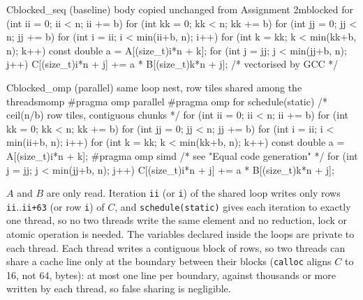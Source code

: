\documentclass[11pt,a4paper]{article}
\newcommand{\concept}[1]{\par\addvspace{8pt}\Needspace{5\baselineskip}%
  \noindent{\color{accent}\bfseries\boldmath #1}\par\nopagebreak\vspace{2pt}}
\begin{document}
\par\addvspace{4pt}
\label{lst:kernels}
\nopagebreak\vspace{2pt}
\begin{codebox}{C}{blocked\_seq (baseline) \textperiodcentered{} body copied unchanged from Assignment 2}{mblocked}
for (int ii = 0; ii < n; ii += b)
  for (int kk = 0; kk < n; kk += b)
    for (int jj = 0; jj < n; jj += b)
      for (int i = ii; i < min(ii+b, n); i++)
        for (int k = kk; k < min(kk+b, n); k++) {
          const double a = A[(size_t)i*n + k];
          for (int j = jj; j < min(jj+b, n); j++)
            C[(size_t)i*n + j] += a * B[(size_t)k*n + j];   /* vectorised by GCC */
        }
\end{codebox}
\vspace{3pt}
\begin{codebox}{C}{blocked\_omp (parallel) \textperiodcentered{} same loop nest, row tiles shared among the threads}{momp}
#pragma omp parallel
{
  #pragma omp for schedule(static)          /* ceil(n/b) row tiles, contiguous chunks */
  for (int ii = 0; ii < n; ii += b)
    for (int kk = 0; kk < n; kk += b)
      for (int jj = 0; jj < n; jj += b)
        for (int i = ii; i < min(ii+b, n); i++)
          for (int k = kk; k < min(kk+b, n); k++) {
            const double a = A[(size_t)i*n + k];
            #pragma omp simd                 /* see "Equal code generation" */
            for (int j = jj; j < min(jj+b, n); j++)
              C[(size_t)i*n + j] += a * B[(size_t)k*n + j];
          }
}
\end{codebox}
\par\addvspace{6pt}

\concept{Safe access to shared data}
$A$ and $B$ are only read. Iteration \texttt{ii} (or \texttt{i}) of the shared loop writes only
rows \texttt{ii}..\texttt{ii+63} (or row \texttt{i}) of $C$, and \texttt{schedule(static)} gives
each iteration to exactly one thread, so no two threads write the same element and no
reduction, lock or atomic operation is needed. The variables declared inside the loops are
private to each thread. Each thread writes a contiguous block of rows, so two threads can share
a cache line only at the boundary between their blocks (\texttt{calloc} aligns $C$ to 16, not
64, bytes): at most one line per boundary, against thousands or more written by each thread,
so false sharing is negligible.
\end{document}
